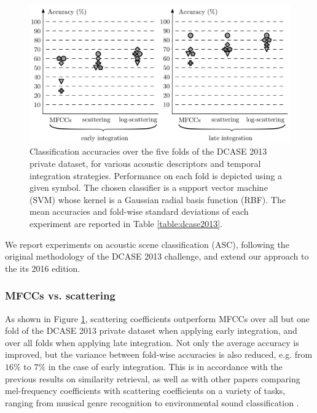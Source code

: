 \documentclass[journal]{IEEEtran}
\makeatletter
\newcommand*{\eg}{e.g.\@\xspace}
\newcommand*{\vs}{vs.\@\xspace}
\makeatother
\begin{document}
\begin{figure}
\begin{center}
\includegraphics[width=\columnwidth]{bw/folds.png}
\caption{Classification accuracies over the five folds of the DCASE 2013 private dataset, for various acoustic descriptors and temporal integration strategies.  Performance on each fold is depicted using a given symbol.
The chosen classifier is a support vector machine (SVM) whose kernel is a Gaussian radial basis function (RBF).
The mean accuracies and fold-wise standard deviations of each experiment are reported in Table \ref{table:dcase2013}.}
\end{center}
\label{fig:folds}
\end{figure}


We report experiments on acoustic scene classification (ASC), following the original methodology of the DCASE 2013 challenge, and extend our approach to the its 2016 edition.

\subsubsection*{MFCCs \vs scattering}

As shown in Figure \ref{fig:folds}, scattering coefficients outperform MFCCs over all but one fold of the DCASE 2013 private dataset when applying early integration, and over all folds when applying late integration.
Not only the average accuracy is improved, but the variance between fold-wise accuracies is also reduced, \eg from $16\%$ to $7\%$ in the case of early integration.
This is in accordance with the previous results on similarity retrieval, as well as with other papers comparing mel-frequency coefficients with scattering coefficients on a variety of tasks, ranging from musical genre recognition \cite{Anden2014} to environmental sound classification \cite{Salamon2015}.
\end{document}
